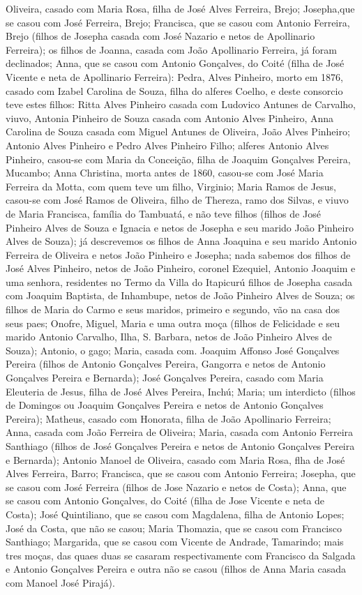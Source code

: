 Oliveira, casado com Maria Rosa, filha de José Alves Ferreira, Brejo; Josepha,que se casou com José Ferreira, Brejo; Francisca, que se casou com Antonio Ferreira, Brejo (filhos de Josepha casada com José Nazario e netos de Apollinario Ferreira); os filhos de Joanna, casada com João Apollinario Ferreira, já foram declinados; Anna, que se casou com Antonio Gonçalves, do Coité (filha de José Vicente e neta de Apollinario Ferreira): Pedra, Alves Pinheiro, morto em 1876, casado com Izabel Carolina de Souza, filha do alferes Coelho, e deste consorcio teve estes filhos: Ritta Alves Pinheiro casada com Ludovico Antunes de Carvalho, viuvo, Antonia Pinheiro de Souza casada com Antonio Alves Pinheiro, Anna Carolina de Souza casada com Miguel Antunes de Oliveira, João Alves Pinheiro; Antonio Alves Pinheiro e Pedro Alves Pinheiro Filho; alferes Antonio Alves Pinheiro, casou-se com Maria da Conceição, filha de Joaquim Gonçalves Pereira, Mucambo; Anna Christina, morta antes de 1860, casou-se com José Maria Ferreira da Motta, com quem teve um filho, Virginio; Maria Ramos de Jesus, casou-se com José Ramos de Oliveira, filho de Thereza, ramo dos Silvas, e viuvo de Maria Francisca, família do Tambuatá, e não teve filhos (filhos de José Pinheiro Alves de Souza e Ignacia e netos de Josepha e seu marido João Pinheiro Alves de Souza); já descrevemos os filhos de Anna Joaquina e seu marido Antonio Ferreira de Oliveira e netos João Pinheiro e Josepha; nada sabemos dos filhos de José Alves Pinheiro, netos de João Pinheiro, coronel Ezequiel, Antonio Joaquim e uma senhora, residentes no Termo da Villa do Itapicurú filhos de Josepha casada com Joaquim Baptista, de Inhambupe, netos de João Pinheiro Alves de Souza; os filhos de Maria do Carmo e seus maridos, primeiro e segundo, vão na casa dos seus paes; Onofre, Miguel, Maria e uma outra moça (filhos de Felicidade e seu marido Antonio Carvalho, Ilha, S. Barbara, netos de João Pinheiro Alves de Souza); Antonio, o gago; Maria, casada com. Joaquim Affonso José Gonçalves Pereira (filhos de Antonio Gonçalves Pereira, Gangorra e netos de Antonio Gonçalves Pereira e Bernarda); José Gonçalves Pereira, casado com Maria Eleuteria de Jesus, filha de José Alves Pereira, Inchú; Maria; um interdicto (filhos de Domingos ou Joaquim Gonçalves Pereira e netos de Antonio Gonçalves Pereira); Matheus, casado com Honorata, filha de João Apollinario Ferreira; Anna, casada com João Ferreira de Oliveira; Maria, casada com Antonio Ferreira Santhiago (filhos de José Gonçalves Pereira e netos de Antonio Gonçalves Pereira e Bernarda); Antonio Manoel de Oliveira, casado com Maria Rosa, flha de José Alves Ferreira, Barro; Francisca, que se casou com Antonio Ferreira; Josepha, que se casou com José Ferreira (filhos de Jose Nazario e netos de Costa); Anna, que se casou com Antonio Gonçalves, do Coité (filha de Jose Vicente e neta de Costa); José Quintiliano, que se casou com Magdalena, filha de Antonio Lopes; José da Costa, que não se casou; Maria Thomazia, que se casou com Francisco Santhiago; Margarida, que se casou com Vicente de Andrade, Tamarindo; mais tres moças, das quaes duas se casaram respectivamente com Francisco da Salgada e Antonio Gonçalves Pereira e outra não se casou (filhos de Anna Maria casada com Manoel José Pirajá).

